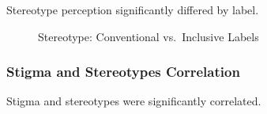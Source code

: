 \documentclass[
  man,
  floatsintext,
  longtable,
  nolmodern,
  notxfonts,
  notimes,
  colorlinks=true,linkcolor=blue,citecolor=blue,urlcolor=blue]{apa7}
\begin{document}
Stereotype perception significantly differed by label.

\begin{figure}

\caption{\label{fig-stereotype-by-label}Stereotype: Conventional
vs.~Inclusive Labels}


\end{figure}%

\subsubsection{Stigma and Stereotypes
Correlation}\label{stigma-and-stereotypes-correlation}

Stigma and stereotypes were significantly correlated.
\end{document}

